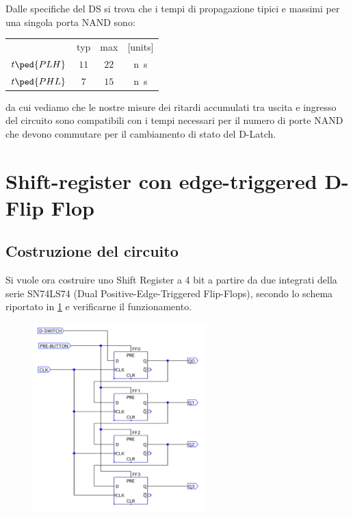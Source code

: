 \documentclass[10pt, a4paper, italian]{article}
\begin{document}
Dalle specifiche del DS si trova che i tempi di propagazione tipici e massimi
per una singola porta NAND sono:
\begin{table}[htbp]
\centering
\begin{tabular}{cccc}
	& typ & max & [units] \\
    $t\ped{PLH}$ & $11$ & $22$ & \si{n\s} \\
    $t\ped{PHL}$ & $7$ & $15$ & \si{n\s}
\end{tabular}
\end{table}
da cui vediamo che le nostre misure dei ritardi accumulati tra uscita e
ingresso del circuito sono compatibili con i tempi necessari per il numero di
porte NAND che devono commutare per il cambiamento di stato del D-Latch.

\section{Shift-register con edge-triggered D-Flip Flop}
\subsection{Costruzione del circuito}
Si vuole ora costruire uno Shift Register a 4 bit a partire da due integrati
della serie SN74LS74 (Dual Positive-Edge-Triggered Flip-Flops), secondo lo
schema riportato in \cref{fig: schem_shift} e verificarne il funzionamento.
\begin{figure}[htbp]
\centering
	\includegraphics[width=0.6\textwidth]{schem_shift}
	\caption{\label{fig: schem_shift}}
\end{figure}
\end{document}
